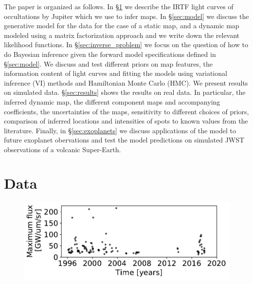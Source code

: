\documentclass[modern]{aastex62}
\begin{document}
The paper is organized as follows.
In \S\ref{sec:data} we describe the IRTF light curves of occultations by Jupiter which we use to infer maps.
In \S\ref{sec:model} we discuss the generative model for the data for the case of a static map, and a dynamic map modeled using a matrix factorization approach and we write down the relevant likelihood functions.
In \S\ref{sec:inverse_problem} we focus on the question of how to do Bayesian inference given the forward model specifications defined in \S\ref{sec:model}.
We discuss and test different priors on map features, the information content of light curves and fitting the models using variational inference (VI) methods and Hamiltonian Monte Carlo (HMC).
We present results on simulated data.
\S\ref{sec:results} shows the results on real data.
In particular, the inferred dynamic map, the  different component maps and accompanying coefficients, the uncertainties of the maps, sensitivity to different choices of priors, comparison of inferred locations and intensities of spots to known values from the literature.
Finally, in \S\ref{sec:exoplanets} we discuss applications of the model to future exoplanet obervations and test the model predictions on simulated JWST observations of a volcanic Super-Earth.

\section{Data}
\label{sec:data}

\begin{figure}[h!]
    \begin{centering}
    \includegraphics[width=0.5\linewidth]{figures/irtf_max_flux.pdf}
    \end{centering}
\end{figure}
\end{document}
